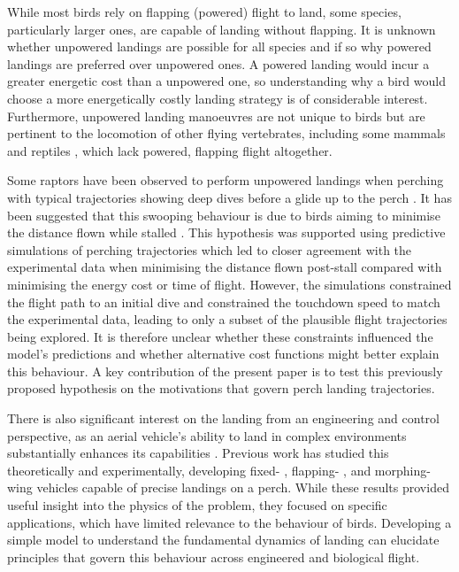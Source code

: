 While most birds rely on flapping (powered) flight to land, some species, particularly larger ones\cite{carruthersAutomaticAeroelasticDevices2007,kleinheerenbrinkOptimizationAvianPerching2022}, are capable of landing without flapping. It is unknown whether unpowered landings are possible for all species and if so why powered landings are preferred over unpowered ones. A powered landing would incur a greater energetic cost than a unpowered one, so understanding why a bird would choose a more energetically costly landing strategy is of considerable interest. Furthermore, unpowered landing manoeuvres are not unique to birds but are pertinent to the locomotion of other flying vertebrates, including some mammals \cite{bahlmanGlidePerformanceAerodynamics2013,byrnesTakeoffLandingKinetics2008} and reptiles \cite{khandelwalHowBiomechanicsPath2020,yeatonUndulationEnablesGliding2020}, which lack powered, flapping flight altogether.

Some raptors have been observed to perform unpowered landings when perching with typical trajectories showing deep dives before a glide up to the perch \cite{carruthersAutomaticAeroelasticDevices2007,kleinheerenbrinkOptimizationAvianPerching2022}. It has been suggested that this swooping behaviour is due to birds aiming to minimise the distance flown while stalled \cite{kleinheerenbrinkOptimizationAvianPerching2022}. This hypothesis was supported using predictive simulations of perching trajectories which led to closer agreement with the experimental data when minimising the distance flown post-stall compared with minimising the energy cost or time of flight. However, the simulations constrained the flight path to an initial dive and constrained the touchdown speed to match the experimental data, leading to only a subset of the plausible flight trajectories being explored. It is therefore unclear whether these constraints influenced the model's predictions and whether alternative cost functions might better explain this behaviour. A key contribution of the present paper is to test this previously proposed hypothesis on the motivations that govern perch landing trajectories.

There is also significant interest on the landing from an engineering and control perspective, as an aerial vehicle's ability to land in complex environments substantially enhances its capabilities \cite{roderickTouchdownTakeoffInterface2017}. Previous work has studied this theoretically \cite{wickenheiserOptimizationPerchingManeuvers2008,alikhanFlightDynamicsOptimization2013,venkateswararaoParametricStudyFixedwing2015} and experimentally, developing fixed- \cite{mooreRobustPoststallPerching2014}, flapping- \cite{zuffereyHowOrnithoptersCan2022}, and morphing-wing vehicles \cite{greatwoodPerchedLandingManoeuvres2017,wuestAgilePerchingManeuvers2024} capable of precise landings on a perch. While these results provided useful insight into the physics of the problem, they focused on specific applications, which have limited relevance to the behaviour of birds. Developing a simple model to understand the fundamental dynamics of landing can elucidate principles that govern this behaviour across engineered and biological flight.

